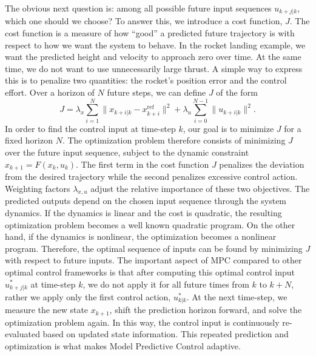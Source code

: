 \documentclass[12pt]{article}
\begin{document}
The obvious next question is: among all possible future input sequences $u_{k+j|k}$, which one should we choose? To answer this, we introduce a cost function, $J$. The cost function is a measure of how ``good'' a predicted future trajectory is with respect to how we want the system to behave. In the rocket landing example, we want the predicted height and velocity to approach zero over time. At the same time, we do not want to use unnecessarily large thrust. A simple way to express this is to penalize two quantities: the rocket's position error and the control effort. Over a horizon of $N$ future steps, we can define $J$ of the form
\[
J = \lambda_x \sum_{i=1}^{N} \| x_{k+i|k} - x_{k+i}^{\text{ref}} \|^2
+ \lambda_u \sum_{i=0}^{N-1} \| u_{k+i|k} \|^2.
\]
In order to find the control input at time-step $k$, our goal is to minimize $J$ for a fixed horizon $N$. The optimization problem therefore consists of minimizing $J$ over the future input sequence, subject to the dynamic constraint $x_{k+1} = F(x_k, u_k)$. The first term in the cost function $J$ penalizes the deviation from the desired trajectory while the second penalizes excessive control action. Weighting factors $\lambda_{x, u}$ adjust the relative importance of these two objectives. The predicted outputs depend on the chosen input sequence through the system dynamics. If the dynamics is linear and the cost is quadratic, the resulting optimization problem becomes a well known quadratic program. On the other hand, if the dynamics is nonlinear, the optimization becomes a nonlinear program. Therefore, the optimal sequence of inputs can be found by minimizing $J$ with respect to future inputs. The important aspect of MPC compared to other optimal control frameworks is that after computing this optimal control input $u^*_{k+j|k}$ at time-step $k$, we do not apply it for all future times from $k$ to $k+N$, rather we apply only the first control action, $u^*_{k|k}$. At the next time-step, we measure the new state $x_{k+1}$, shift the prediction horizon forward, and solve the optimization problem again. In this way, the control input is continuously re-evaluated based on updated state information. This repeated prediction and optimization is what makes Model Predictive Control adaptive.
\end{document}
